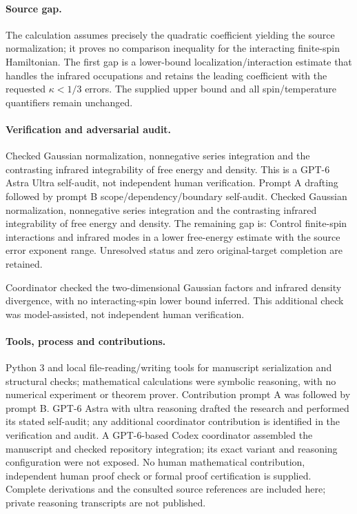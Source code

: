 \documentclass[11pt]{article}
\begin{document}
\paragraph{Source gap.} The calculation assumes precisely the quadratic coefficient yielding the source normalization; it proves no comparison inequality for the interacting finite-spin Hamiltonian. The first gap is a lower-bound localization/interaction estimate that handles the infrared occupations and retains the leading coefficient with the requested \(\kappa<1/3\) errors. The supplied upper bound and all spin/temperature quantifiers remain unchanged.

\paragraph{Verification and adversarial audit.}
Checked Gaussian normalization, nonnegative series integration and the contrasting infrared integrability of free energy and density. This is a GPT-6 Astra Ultra self-audit, not independent human verification. Prompt A drafting followed by prompt B scope/dependency/boundary self-audit. Checked Gaussian normalization, nonnegative series integration and the contrasting infrared integrability of free energy and density. The remaining gap is: Control finite-spin interactions and infrared modes in a lower free-energy estimate with the source error exponent range. Unresolved status and zero original-target completion are retained.

Coordinator checked the two-dimensional Gaussian factors and infrared density divergence, with no interacting-spin lower bound inferred. This additional check was model-assisted, not independent human verification.

\paragraph{Tools, process and contributions.}
Python 3 and local file-reading/writing tools for manuscript serialization and structural checks; mathematical calculations were symbolic reasoning, with no numerical experiment or theorem prover. Contribution prompt A was followed by prompt B. GPT-6 Astra with ultra reasoning drafted the research and performed its stated self-audit; any additional coordinator contribution is identified in the verification and audit. A GPT-6-based Codex coordinator assembled the manuscript and checked repository integration; its exact variant and reasoning configuration were not exposed. No human mathematical contribution, independent human proof check or formal proof certification is supplied. Complete derivations and the consulted source references are included here; private reasoning transcripts are not published.
\end{document}
